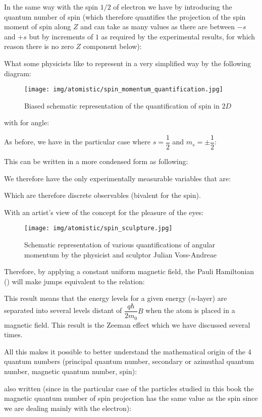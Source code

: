 	In the same way with the spin $1/2$ of electron we have by introducing the quantum number of spin (which therefore quantifies the projection of the spin moment of spin along $Z$ and can take as many values as there are between $-s$ and $+s$ but by increments of $1$ as required by the experimental results, for which reason there is no zero $Z$ component below):
	
	What some physicists like to represent in a very simplified way by the following diagram:
	\begin{figure}[H]
		\centering
		\texttt{[image: img/atomistic/spin\_momentum\_quantification.jpg]}	
		\caption{Biased schematic representation of the quantification of spin in $2D$}
	\end{figure}
	with for angle:
	
	As before, we have in the particular case where $s=\dfrac{1}{2}$ and $m_s=\pm\dfrac{1}{2}$:
	
	This can be written in a more condensed form as following:
	
	We therefore have the only experimentally measurable variables that are:
	
	Which are therefore discrete observables (bivalent for the spin).

	With an artist's view of the concept for the pleasure of the eyes:
	\begin{figure}[H]
		\centering
		\texttt{[image: img/atomistic/spin\_sculpture.jpg]}	
		\caption{Schematic representation of various quantifications of angular momentum by the physicist and sculptor Julian Voss-Andreae}
	\end{figure}
	Therefore, by applying a constant uniform magnetic field, the Pauli Hamiltonian () will make jumps equivalent to the relation:
	
	This result means that the energy levels for a given energy ($n$-layer) are separated into several levels distant of $\dfrac{q\hbar}{2m_0}B$ when the atom is placed in a magnetic field. This result is the Zeeman effect which we have discussed several times.
	
	All this makes it possible to better understand the mathematical origin of the $4$ quantum numbers (principal quantum number, secondary or azimuthal quantum number, magnetic quantum number, spin):
	
	also written (since in the particular case of the particles studied in this book the magnetic quantum number of spin projection has the same value as the spin since we are dealing mainly with the electron):
	
